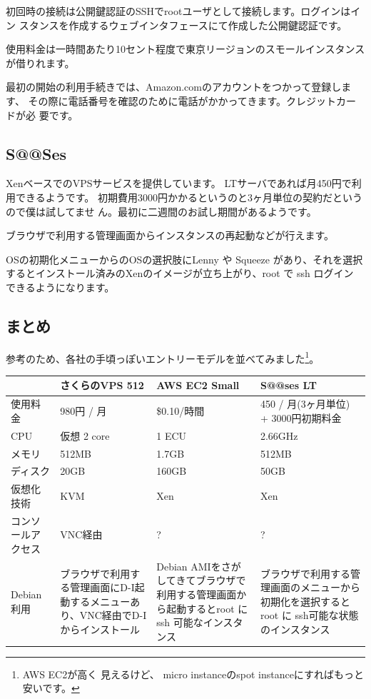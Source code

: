 \documentclass[mingoth,a4paper]{jsarticle}
\begin{document}
初回時の接続は公開鍵認証のSSHでrootユーザとして接続します。ログインはイン
スタンスを作成するウェブインタフェースにて作成した公開鍵認証です。

使用料金は一時間あたり10セント程度で東京リージョンのスモールインスタンス
が借りれます。

最初の開始の利用手続きでは、Amazon.comのアカウントをつかって登録します、
その際に電話番号を確認のために電話がかかってきます。クレジットカードが必
要です。

\subsection{S@@Ses}

XenベースでのVPSサービスを提供しています。
LTサーバであれば月450円で利用できるようです。
初期費用3000円かかるというのと3ヶ月単位の契約だというので僕は試してませ
ん。最初に二週間のお試し期間があるようです。

ブラウザで利用する管理画面からインスタンスの再起動などが行えます。

OSの初期化メニューからのOSの選択肢にLenny や Squeeze があり、それを選択
するとインストール済みのXenのイメージが立ち上がり、root で ssh ログイン
できるようになります。

\subsection{まとめ}

参考のため、各社の手頃っぽいエントリーモデルを並べてみました\footnote{AWS EC2が高く
見えるけど、 micro instanceのspot instanceにすればもっと安いです。}。

\begin{tabular}{|l|p{11em}|p{12em}|p{11em}|}
\hline
 & さくらのVPS 512 & AWS EC2 Small & S@@ses LT \\
\hline
使用料金 & 980円 / 月& \$0.10/時間 & 450 / 月(3ヶ月単位) + 3000円初期料金\\
CPU & 仮想 2 core & 1 ECU & 2.66GHz\\
メモリ & 512MB & 1.7GB& 512MB \\
ディスク & 20GB & 160GB & 50GB \\
仮想化技術 & KVM & Xen & Xen \\
コンソールアクセス & VNC経由 & ? & ? \\
Debian利用 &
ブラウザで利用する管理画面にD-I起動するメニューあり、VNC経由でD-Iからインストール&
Debian AMIをさがしてきてブラウザで利用する管理画面から起動するとroot に ssh 可能なインスタンス &
ブラウザで利用する管理画面のメニューから初期化を選択すると root に ssh可能な状態のインスタンス \\
\hline
\end{tabular}
\end{document}
